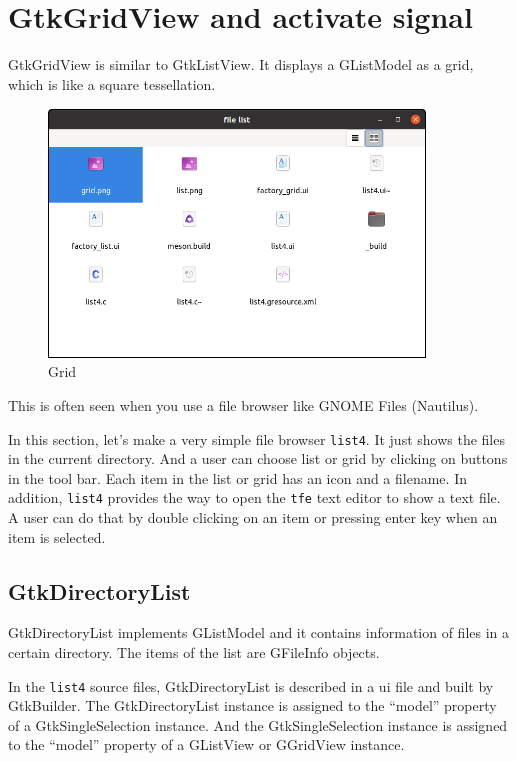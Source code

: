 \section{GtkGridView and activate
signal}\label{gtkgridview-and-activate-signal}

GtkGridView is similar to GtkListView. It displays a GListModel as a
grid, which is like a square tessellation.

\begin{figure}
\centering
\includegraphics[width=10cm,height=6.6cm]{../image/list4.png}
\caption{Grid}
\end{figure}

This is often seen when you use a file browser like GNOME Files
(Nautilus).

In this section, let's make a very simple file browser
\passthrough{\lstinline!list4!}. It just shows the files in the current
directory. And a user can choose list or grid by clicking on buttons in
the tool bar. Each item in the list or grid has an icon and a filename.
In addition, \passthrough{\lstinline!list4!} provides the way to open
the \passthrough{\lstinline!tfe!} text editor to show a text file. A
user can do that by double clicking on an item or pressing enter key
when an item is selected.

\subsection{GtkDirectoryList}\label{gtkdirectorylist}

GtkDirectoryList implements GListModel and it contains information of
files in a certain directory. The items of the list are GFileInfo
objects.

In the \passthrough{\lstinline!list4!} source files, GtkDirectoryList is
described in a ui file and built by GtkBuilder. The GtkDirectoryList
instance is assigned to the ``model'' property of a GtkSingleSelection
instance. And the GtkSingleSelection instance is assigned to the
``model'' property of a GListView or GGridView instance.

